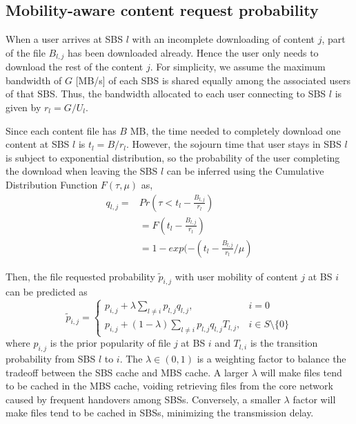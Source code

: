 \documentclass[conference]{IEEEtran}
\begin{document}
\subsection{Mobility-aware content request probability}
When a user arrives at SBS $l$ with an incomplete downloading of content $j$, part of the file $B_{l,j}$ has been downloaded already. Hence the user only needs to download the rest of the content $j$. For simplicity, we assume the maximum bandwidth of $G$ [MB/s] of each SBS is shared equally among the associated users of that SBS\cite{8108779}. Thus, the bandwidth allocated to each user connecting to SBS $l$ is given by $r_l=G/U_l$.

Since each content file has $B$ MB, the time needed to completely download one content at SBS $l$ is $t_l=B/r_l$.
However, the sojourn time that user stays in SBS $l$ is subject to exponential distribution, so the probability of the user completing the download when leaving the SBS $l$ can be inferred using the Cumulative Distribution Function $F(\tau,\mu)$ as,
\begin{equation}
  \begin{aligned}
 q_{l,j}=& Pr(\tau<t_l-\frac{B_{l,j}}{r_l})\\
  &=F(t_l-\frac{B_{l,j}}{r_l})\\
  &=1-exp(-(t_l-\frac{B_{l,j}}{r_l}/\mu)
  \end{aligned}
\end{equation}

Then, the file requested probability ${\tilde{p}_{i,j}}$ with user mobility of content $j$ at BS $i$ can be predicted as
\begin{equation}
{\tilde{p}_{i,j}}=
\begin{cases}
p_{i,j}+\lambda\sum_{l\neq i}p_{l,j}q_{l,j},  & i=0\\
p_{i,j}+(1-\lambda)\sum_{l\neq i}p_{l,j}q_{l,j}T_{l,j}, & i\in S\setminus\{0\}
\end{cases}
\end{equation}
where $p_{i,j}$ is the prior popularity of file $j$ at BS $i$ and $T_{l,i}$ is the transition probability from SBS $l$ to $i$. The  $\lambda\in(0,1)$ is a weighting factor to balance the tradeoff between the SBS cache and MBS cache. A larger $\lambda$ will make files tend to be cached in the MBS cache, voiding retrieving files from the core network caused by frequent handovers among SBSs. Conversely, a smaller $\lambda$ factor will make files tend to be cached in SBSs, minimizing the transmission delay.
\end{document}
